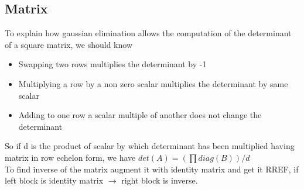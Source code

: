 \documentclass[8pt, a4paper, oneside, twocolumn]{extarticle}
\begin{document}
\subsection{Matrix}
To explain how gaussian elimination allows the computation of the determinant of a square matrix, we should know
\begin{itemize}
    \item Swapping two rows multiplies the determinant by -1
    \item Multiplying a row by a non zero scalar multiplies the determinant by same scalar
    \item Adding to one row a scalar multiple of another does not change the determinant
\end{itemize}
So if d is the product of scalar by which determinant has been multiplied having matrix in row echelon form, we have $det(A) = (\prod diag(B))/d$
\\To find inverse of the matrix augment it with identity matrix and get it RREF, if left block is identity matrix $\rightarrow$ right block is inverse. 
\end{document}
